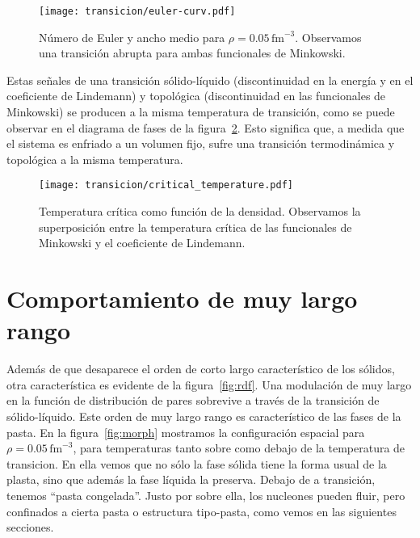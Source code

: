 \begin{figure}%
  \centering \texttt{[image: transicion/euler-curv.pdf]}
  \caption{Número de Euler y ancho medio para $\rho=0.05\,\text{fm}^{-3}$.
    Observamos una transición abrupta para ambas funcionales de Minkowski.}
  \label{fig:euler-curv}
\end{figure}

Estas señales de una transición sólido-líquido (discontinuidad en la energía y en el coeficiente de Lindemann) y topológica (discontinuidad en las funcionales de Minkowski) se producen a la misma temperatura de transición, como se puede observar en el diagrama de fases de la figura~\ref{fig:critical_temperature}.
Esto significa que, a medida que el sistema es enfriado a un volumen fijo, sufre una transición termodinámica y topológica a la misma temperatura.

\begin{figure}[floatfix]  \centering
  \texttt{[image: transicion/critical\_temperature.pdf]}
  \caption{Temperatura crítica como función de la densidad.
    Observamos la superposición entre la temperatura crítica de las funcionales de Minkowski y el coeficiente de Lindemann.}
  \label{fig:critical_temperature}
\end{figure}


\section{Comportamiento de muy largo rango}\label{very_long}
Además de que desaparece el orden de corto largo característico de los sólidos, otra característica es evidente de la figura~\ref{fig:rdf}.
Una modulación de muy largo en la función de distribución de pares sobrevive a través de la transición de sólido-líquido.
Este orden de muy largo rango es característico de las fases de la pasta.
En la figura~\ref{fig:morph} mostramos la configuración espacial para $\rho=0.05\,\text{fm}^{-3}$, para temperaturas tanto sobre como debajo de la temperatura de transicion.
En ella vemos que no sólo la fase sólida tiene la forma usual de la plasta, sino que además la fase líquida la preserva.
Debajo de a transición, tenemos ``pasta congelada''.
Justo por sobre ella, los nucleones pueden fluir, pero confinados a cierta pasta o estructura tipo-pasta, como vemos en las siguientes secciones.

